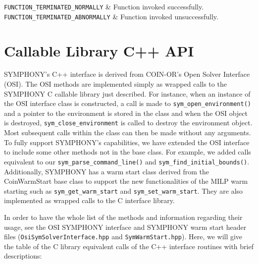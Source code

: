 \returns

{\tt FUNCTION\_TERMINATED\_NORMALLY} & Function invoked successfully.\\
{\tt FUNCTION\_TERMINATED\_ABNORMALLY} & Function invoked unsuccessfully.\\
\et  
\ed
\vspace{1ex}

\ed

\newpage

\section{Callable Library C++ API}
\label{C++_Interface}

SYMPHONY's C++ interface is derived from COIN-OR's Open Solver Interface
(OSI). The OSI methods are implemented simply as wrapped calls to the SYMPHONY
C callable library just described. For instance, when an instance of the OSI
interface class is constructed, a call is made to
\texttt{sym\_open\_environment()} and a pointer to the environment is stored
in the class and when the OSI object is destroyed,
\texttt{sym\_close\_environment} is called to destroy the environment object. 
Most subsequent calls within the class can then be made without
any arguments. To fully support SYMPHONY's capabilities, we have 
extended the OSI interface to include some other methods not in the base 
class. For example, we added calls equivalent to our 
\texttt{sym\_parse\_command\_line()} and \texttt{sym\_find\_initial\_bounds()}.
Additionally, SYMPHONY has a warm start class derived from the CoinWarmStart 
base class to support the new functionalities of the MILP warm starting such 
as \texttt{sym\_get\_warm\_start} and \texttt{sym\_set\_warm\_start}. They are 
also implemented as wrapped calls to the C interface library. 

In order to have the whole list of the methods and information 
regarding their usage, see the OSI SYMPHONY interface and SYMPHONY warm start
header files (\texttt{OsiSymSolverInterface.hpp} and 
\texttt{SymWarmStart.hpp}). Here, we will give the table of the C library 
equivalent calls of the C++ interface routines with brief descriptions:

\newpage

